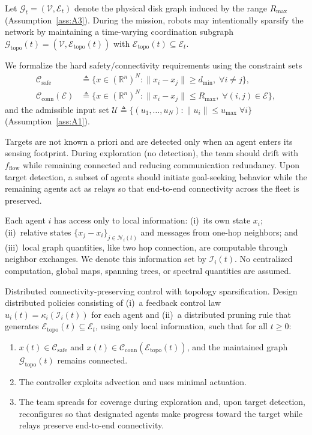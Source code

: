 \documentclass[conference]{IEEEconf}
\theoremstyle{plain}
\begin{document}
Let $\mathcal{G}_t=(\mathcal{V},\mathcal{E}_t)$ denote the physical disk graph induced by the range $R_{\max}$ (Assumption~\ref{ass:A3}). During the mission, robots may intentionally sparsify the network by maintaining a time-varying coordination subgraph $\mathcal{G}_{\mathrm{topo}}(t)=(\mathcal{V},\mathcal{E}_{\mathrm{topo}}(t))$ with $\mathcal{E}_{\mathrm{topo}}(t)\subseteq \mathcal{E}_t$.

We formalize the hard safety/connectivity requirements using the constraint sets
\begin{align*}
\mathcal{C}_{\mathrm{safe}} &\triangleq \Big\{x\in(\mathbb{R}^n)^N : \|x_i-x_j\|\ge d_{\min},\;\forall i\neq j\Big\},\\
\mathcal{C}_{\mathrm{conn}}(\mathcal{E}) &\triangleq \Big\{x\in(\mathbb{R}^n)^N : \|x_i-x_j\|\le R_{\max},\;\forall (i,j)\in\mathcal{E}\Big\},
\end{align*}
and the admissible input set $\mathcal{U}\triangleq\{(u_1,\dots,u_N):\|u_i\|\le u_{\max}\;\forall i\}$ (Assumption~\ref{ass:A1}).

Targets are not known a priori and are detected only when an agent enters its sensing footprint. During exploration (no detection), the team should drift with $f_{\text{flow}}$ while remaining connected and reducing communication redundancy. Upon target detection, a subset of agents should initiate goal-seeking behavior while the remaining agents act as relays so that end-to-end connectivity across the fleet is preserved.

Each agent $i$ has access only to local information: (i)~its own state $x_i$; (ii)~relative states $\{x_j-x_i\}_{j\in\mathcal{N}_i(t)}$ and messages from one-hop neighbors; and (iii)~local graph quantities, like two hop connection, are computable through neighbor exchanges. We denote this information set by $\mathcal{I}_i(t)$. No centralized computation, global maps, spanning trees, or spectral quantities are assumed.

\noindent Distributed connectivity-preserving control with topology sparsification.
Design distributed policies consisting of (i)~a feedback control law $u_i(t)=\kappa_i(\mathcal{I}_i(t))$ for each agent and (ii)~a distributed pruning rule that generates $\mathcal{E}_{\mathrm{topo}}(t)\subseteq\mathcal{E}_t$, using only local information, such that for all $t\ge 0$:
\begin{enumerate}
    \item  $x(t)\in\mathcal{C}_{\mathrm{safe}}$ and $x(t)\in\mathcal{C}_{\mathrm{conn}}(\mathcal{E}_{\mathrm{topo}}(t))$, and the maintained graph $\mathcal{G}_{\mathrm{topo}}(t)$ remains connected.
    \item The controller exploits advection and uses minimal actuation.
    \item The team spreads for coverage during exploration and, upon target detection, reconfigures so that designated agents make progress toward the target while relays preserve end-to-end connectivity.
\end{enumerate}
\end{document}
